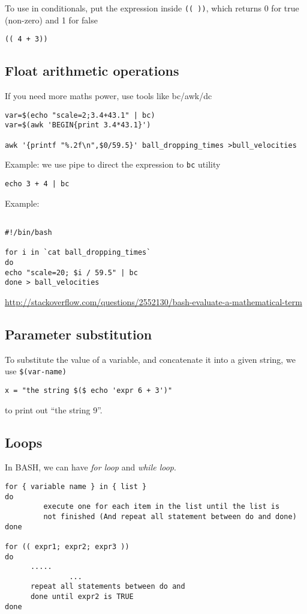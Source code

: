 To use in conditionals, put the expression inside \verb!(( ))!, which returns 
0 for true (non-zero) and 1 for false
\begin{verbatim}
(( 4 + 3))
\end{verbatim}


\subsection{Float arithmetic operations}

 If you need more maths power, use tools like bc/awk/dc

\begin{verbatim}
var=$(echo "scale=2;3.4+43.1" | bc)
var=$(awk 'BEGIN{print 3.4*43.1}')

awk '{printf "%.2f\n",$0/59.5}' ball_dropping_times >bull_velocities
\end{verbatim}

Example: we use pipe to direct the expression to \verb!bc! utility
\begin{verbatim}
echo 3 + 4 | bc
\end{verbatim}

Example:
\begin{verbatim}

#!/bin/bash

for i in `cat ball_dropping_times`
do
echo "scale=20; $i / 59.5" | bc 
done > ball_velocities
\end{verbatim}

\url{http://stackoverflow.com/questions/2552130/bash-evaluate-a-mathematical-term}
\subsection{Parameter substitution}

To substitute the value of a variable, and concatenate it into a given string,
we use \verb!$(var-name)!
\begin{verbatim}
x = "the string $($ echo 'expr 6 + 3')"
\end{verbatim}
to print out ``the string 9''.




\subsection{Loops}

In BASH, we can have {\it for loop} and {\it while loop}.

\begin{verbatim}
for { variable name } in { list }
do
         execute one for each item in the list until the list is
         not finished (And repeat all statement between do and done)
done

for (( expr1; expr2; expr3 ))
do
      .....
			   ...
      repeat all statements between do and 
      done until expr2 is TRUE
done
\end{verbatim}


